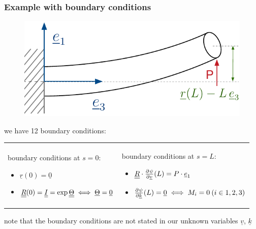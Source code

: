 \begin{frame}
  \frametitle{Example with boundary conditions}

  \begin{figure}
    \centering
    \includegraphics[width=14cm, keepaspectratio=true]{sections/cosserat_rods/images/MinimumPotentialEnergyMethodExample}
  \end{figure}
  
  \vspace{1em}
  we have 12 boundary conditions:
  
  \vspace{0.5em}
  \begin{tabularx}{\linewidth}{XX}
    {
      boundary conditions at $s=0$:
      \begin{itemize}
        \item $\underline{r}(0) = \underline{0}$
        \item $\underline{\underline{R}}(0) = \underline{\underline{I}} =
          \exp{\underline{\underline{\Theta}}} \iff \underline{\Theta}=\underline{0}$
      \end{itemize}
    } & {
      boundary conditions at $s=L$:
      \begin{itemize}
        \item $\doubleunderline{R} \cdot \pd{\psi}{\underline{v}}(L) = P \cdot \underline{e}_1$
        \item $\pd{\psi}{\underline{k}}(L) = \underline{0} \iff M_i = 0 \: (i \in {1,2,3})$
      \end{itemize}
    }
  \end{tabularx}
  
  note that the boundary conditions are not stated in our unknown variables $\underline{v}$, $\underline{k}$
\end{frame}


